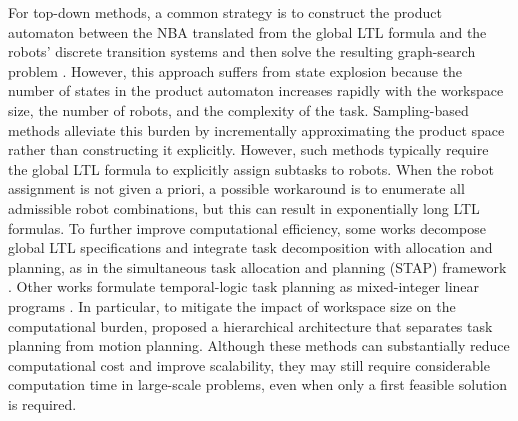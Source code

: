 \documentclass[lettersize,journal]{IEEEtran}
\theoremstyle{italiclemma}
\theoremstyle{italiclemma}
\theoremstyle{definition}
\begin{document}
For top-down methods, a common strategy is to construct the product automaton between the NBA translated from the global LTL formula and the robots' discrete transition systems and then solve the resulting graph-search problem \cite{smith2010optimal,Kloetzer2015LTL,9196928,DING2014399}.  However, this approach suffers from state explosion because the number of states in the product automaton increases rapidly with the workspace size, the number of robots, and the complexity of the task. Sampling-based methods \cite{kantaros2020stylus,kantaros2018sampling,9385707} alleviate this burden by incrementally approximating the product space rather than constructing it explicitly. However, such methods typically require the global LTL formula to explicitly assign subtasks to robots. When the robot assignment is not given a priori, a possible workaround is to enumerate all admissible robot combinations, but this can result in exponentially long LTL formulas. 
To further improve computational efficiency, some works decompose global LTL specifications and integrate task decomposition with allocation and planning, as in the simultaneous task allocation and planning (STAP) framework \cite{7989094, schillinger2017multi,schillinger2018simultaneous}. Other works formulate temporal-logic task planning as mixed-integer linear programs \cite{luo2022temporal,karaman2008vehicle,9663414, Raman2015MILP}. In particular, to mitigate the impact of workspace size on the computational burden, \cite{luo2022temporal} proposed a hierarchical architecture that separates task planning from motion planning. Although these methods can substantially reduce computational cost and improve scalability, they may still require considerable computation time in large-scale problems, even when only a first feasible solution is required.
\end{document}
